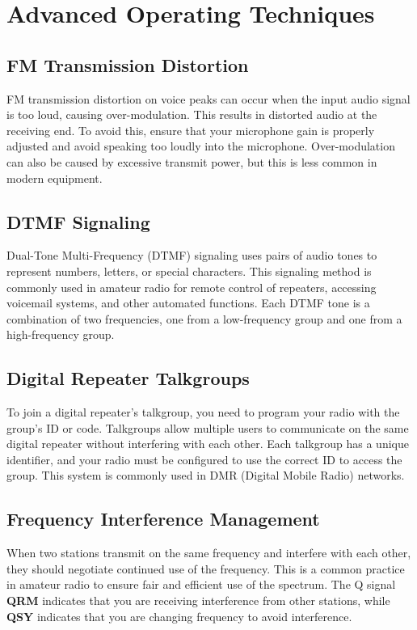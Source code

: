 \section{Advanced Operating Techniques}
\label{section:advanced_operating}

\subsection*{FM Transmission Distortion}
FM transmission distortion on voice peaks can occur when the input audio signal is too loud, causing over-modulation. This results in distorted audio at the receiving end. To avoid this, ensure that your microphone gain is properly adjusted and avoid speaking too loudly into the microphone. Over-modulation can also be caused by excessive transmit power, but this is less common in modern equipment.

\subsection*{DTMF Signaling}
Dual-Tone Multi-Frequency (DTMF) signaling uses pairs of audio tones to represent numbers, letters, or special characters. This signaling method is commonly used in amateur radio for remote control of repeaters, accessing voicemail systems, and other automated functions. Each DTMF tone is a combination of two frequencies, one from a low-frequency group and one from a high-frequency group.

\subsection*{Digital Repeater Talkgroups}
To join a digital repeater's talkgroup, you need to program your radio with the group's ID or code. Talkgroups allow multiple users to communicate on the same digital repeater without interfering with each other. Each talkgroup has a unique identifier, and your radio must be configured to use the correct ID to access the group. This system is commonly used in DMR (Digital Mobile Radio) networks.

\subsection*{Frequency Interference Management}
When two stations transmit on the same frequency and interfere with each other, they should negotiate continued use of the frequency. This is a common practice in amateur radio to ensure fair and efficient use of the spectrum. The Q signal \textbf{QRM} indicates that you are receiving interference from other stations, while \textbf{QSY} indicates that you are changing frequency to avoid interference.

